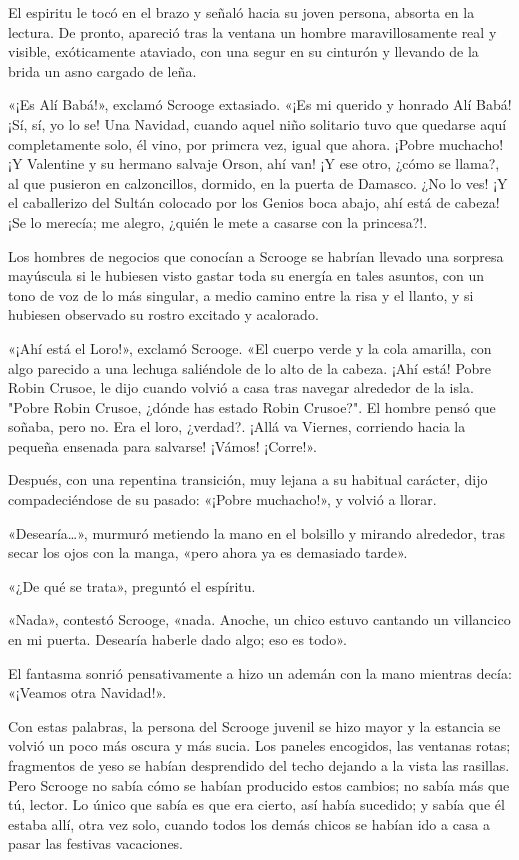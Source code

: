 \documentclass{novela}
\begin{document}
 El espiritu le tocó en el brazo y señaló hacia su joven persona, absorta en la lectura. De pronto, apareció tras la ventana un hombre maravillosamente real y visible, exóticamente ataviado, con una segur en su cinturón y llevando de la brida un asno cargado de leña.

 «¡Es Alí Babá!», exclamó Scrooge extasiado. «¡Es mi querido y honrado Alí Babá! ¡Sí, sí, yo lo se! Una Navidad, cuando aquel niño solitario tuvo que quedarse aquí completamente solo, él vino, por primcra vez, igual que ahora. ¡Pobre muchacho! ¡Y Valentine y su hermano salvaje Orson, ahí van! ¡Y ese otro, ¿cómo se llama?, al que pusieron en calzoncillos, dormido, en la puerta de Damasco. ¿No lo ves! ¡Y el caballerizo del Sultán colocado por los Genios boca abajo, ahí está de cabeza! ¡Se lo merecía; me alegro, ¿quién le mete a casarse con la princesa?!.

 Los hombres de negocios que conocían a Scrooge se habrían llevado una sorpresa mayúscula si le hubiesen visto gastar toda su energía en tales asuntos, con un tono de voz de lo más singular, a medio camino entre la risa y el llanto, y si hubiesen observado su rostro excitado y acalorado.

 «¡Ahí está el Loro!», exclamó Scrooge. «El cuerpo verde y la cola amarilla, con algo parecido a una lechuga saliéndole de lo alto de la cabeza. ¡Ahí está! Pobre Robin Crusoe, le dijo cuando volvió a casa tras navegar alrededor de la isla. "Pobre Robin Crusoe, ¿dónde has estado Robin Crusoe?". El hombre pensó que soñaba, pero no. Era el loro, ¿verdad?. ¡Allá va Viernes, corriendo hacia la pequeña ensenada para salvarse! ¡Vámos! ¡Corre!».

 Después, con una repentina transición, muy lejana a su habitual carácter, dijo compadeciéndose de su pasado: «¡Pobre muchacho!», y volvió a llorar.

 «Desearía{\ldots}», murmuró metiendo la mano en el bolsillo y mirando alrededor, tras secar los ojos con la manga, «pero ahora ya es demasiado tarde».

 «¿De qué se trata», preguntó el espíritu.

 «Nada», contestó Scrooge, «nada. Anoche, un chico estuvo cantando un villancico en mi puerta. Desearía haberle dado algo; eso es todo».

 El fantasma sonrió pensativamente a hizo un ademán con la mano mientras decía: «¡Veamos otra Navidad!».

 Con estas palabras, la persona del Scrooge juvenil se hizo mayor y la estancia se volvió un poco más oscura y más sucia. Los paneles encogidos, las ventanas rotas; fragmentos de yeso se habían desprendido del techo dejando a la vista las rasillas. Pero Scrooge no sabía cómo se habían producido estos cambios; no sabía más que tú, lector. Lo único que sabía es que era cierto, así había sucedido; y sabía que él estaba allí, otra vez solo, cuando todos los demás chicos se habían ido a casa a pasar las festivas vacaciones.
\end{document}

